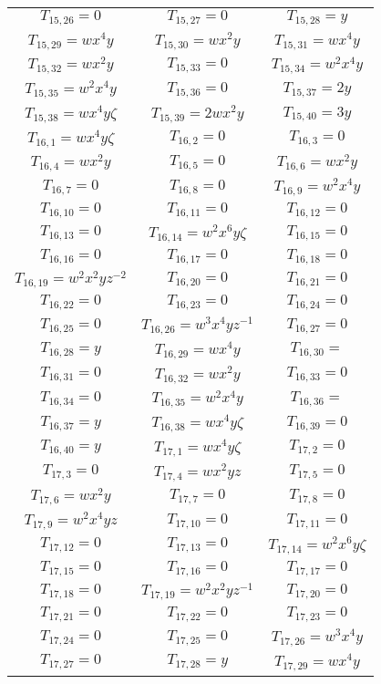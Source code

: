 \begin{longtable}{|c|c|c|}
$T_{15,26}= 0$&
$T_{15,27}= 0$&
$T_{15,28}= y$\\
$T_{15,29}= wx^4y$&
$T_{15,30}= wx^2y$&
$T_{15,31}= wx^4y$\\
$T_{15,32}= wx^2y$&
$T_{15,33}= 0$&
$T_{15,34}= w^2x^4y$\\
$T_{15,35}= w^2x^4y$&
$T_{15,36}= 0$&
$T_{15,37}= 2y$\\
$T_{15,38}= wx^4y\zeta$&
$T_{15,39}= 2wx^2y$&
$T_{15,40}= 3y$\\
$T_{16,1}= wx^4y\zeta$&
$T_{16,2}= 0$&
$T_{16,3}= 0$\\
$T_{16,4}= wx^2y$&
$T_{16,5}= 0$&
$T_{16,6}= wx^2y$\\
$T_{16,7}= 0$&
$T_{16,8}= 0$&
$T_{16,9}= w^2x^4y$\\
$T_{16,10}= 0$&
$T_{16,11}= 0$&
$T_{16,12}= 0$\\
$T_{16,13}= 0$&
$T_{16,14}= w^2x^6y\zeta$&
$T_{16,15}= 0$\\
$T_{16,16}= 0$&
$T_{16,17}= 0$&
$T_{16,18}= 0$\\
$T_{16,19}= w^2x^2yz^{-2}$&
$T_{16,20}= 0$&
$T_{16,21}= 0$\\
$T_{16,22}= 0$&
$T_{16,23}= 0$&
$T_{16,24}= 0$\\
$T_{16,25}= 0$&
$T_{16,26}= w^3x^4yz^{-1}$&
$T_{16,27}= 0$\\
$T_{16,28}= y$&
$T_{16,29}= wx^4y$&
$T_{16,30}= $\\
$T_{16,31}= 0$&
$T_{16,32}= wx^2y$&
$T_{16,33}= 0$\\
$T_{16,34}= 0$&
$T_{16,35}= w^2x^4y$&
$T_{16,36}= $\\
$T_{16,37}= y$&
$T_{16,38}= wx^4y\zeta$&
$T_{16,39}= 0$\\
$T_{16,40}= y$&
$T_{17,1}= wx^4y\zeta$&
$T_{17,2}= 0$\\
$T_{17,3}= 0$&
$T_{17,4}= wx^2yz$&
$T_{17,5}= 0$\\
$T_{17,6}= wx^2y$&
$T_{17,7}= 0$&
$T_{17,8}= 0$\\
$T_{17,9}= w^2x^4yz$&
$T_{17,10}= 0$&
$T_{17,11}= 0$\\
$T_{17,12}= 0$&
$T_{17,13}= 0$&
$T_{17,14}= w^2x^6y\zeta$\\
$T_{17,15}= 0$&
$T_{17,16}= 0$&
$T_{17,17}= 0$\\
$T_{17,18}= 0$&
$T_{17,19}= w^2x^2yz^{-1}$&
$T_{17,20}= 0$\\
$T_{17,21}= 0$&
$T_{17,22}= 0$&
$T_{17,23}= 0$\\
$T_{17,24}= 0$&
$T_{17,25}= 0$&
$T_{17,26}= w^3x^4y$\\
$T_{17,27}= 0$&
$T_{17,28}= y$&
$T_{17,29}= wx^4y$\\

\end{longtable}
